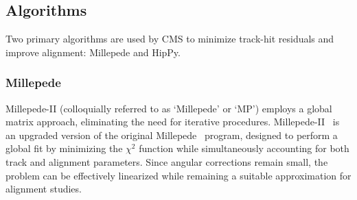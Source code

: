 






\subsection{Algorithms}

Two primary algorithms are used by CMS to minimize track-hit residuals and improve alignment: Millepede and HipPy. 

\subsubsection{Millepede}

Millepede-II (colloquially referred to as `Millepede' or `MP') employs a global matrix approach, eliminating the need for iterative procedures. Millepede-II~\cite{BLOBEL20065} is an upgraded version of the original Millepede~\cite{blobel2002newmethodhighprecisionalignment} program, designed to perform a global fit by minimizing the $\chi^2$ function while simultaneously accounting for both track and alignment parameters. Since angular corrections remain small, the problem can be effectively linearized while remaining a suitable approximation for alignment studies.

